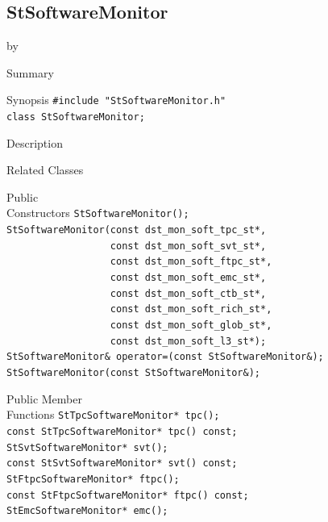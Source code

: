 \documentclass[twoside]{article}
\newcommand{\entrylabel}[1]{\mbox{\textbf{{#1}}}\hfil}%
\newenvironment{entry}
{\begin{list}{}%
    {\renewcommand{\makelabel}{\entrylabel}%
     \setlength{\labelwidth}{90pt}%
     \setlength{\leftmargin}{\labelwidth}
     \advance\leftmargin by \labelsep%
      }%
    }%
  {\end{list}}
\newcommand{\Entrylabel}[1]%
{\raisebox{0pt}[1ex][0pt]{\makebox[\labelwidth][l]%
    {\parbox[t]{\labelwidth}{\hspace{0pt}\textbf{{#1}}}}}}
\newenvironment{Entry}%
{\renewcommand{\entrylabel}{\Entrylabel}\begin{entry}}%
  {\end{entry}}
\begin{document}
\subsection{StSoftwareMonitor}
\label{sec:StSoftwareMonitor}
\begin{Entry}
\item[Summary]
\item[Synopsis]
    \verb+#include "StSoftwareMonitor.h"+\\
    \verb+class StSoftwareMonitor;+\\
\item[Description]
\item[Related Classes]
\item[Public\\ Constructors]
    \verb+StSoftwareMonitor();+\\
    \verb+StSoftwareMonitor(const dst_mon_soft_tpc_st*,+\\
    \verb+                  const dst_mon_soft_svt_st*,+\\
    \verb+                  const dst_mon_soft_ftpc_st*,+\\
    \verb+                  const dst_mon_soft_emc_st*,+\\
    \verb+                  const dst_mon_soft_ctb_st*,+\\
    \verb+                  const dst_mon_soft_rich_st*,+\\
    \verb+                  const dst_mon_soft_glob_st*,+\\
    \verb+                  const dst_mon_soft_l3_st*);+\\
    \verb+StSoftwareMonitor& operator=(const StSoftwareMonitor&);+\\
    \verb+StSoftwareMonitor(const StSoftwareMonitor&);+\\
\item[Public Member\\ Functions]
    \verb+StTpcSoftwareMonitor* tpc();+\\
    \verb+const StTpcSoftwareMonitor* tpc() const;+\\
    \verb+StSvtSoftwareMonitor* svt();+\\
    \verb+const StSvtSoftwareMonitor* svt() const;+\\
    \verb+StFtpcSoftwareMonitor* ftpc();+\\
    \verb+const StFtpcSoftwareMonitor* ftpc() const;+\\
    \verb+StEmcSoftwareMonitor* emc();+\\

\end{Entry}
\end{document}
